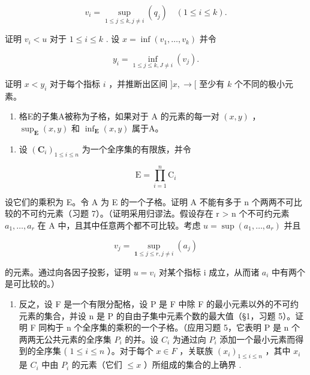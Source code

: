 \[
v _ {i} = \sup _ {1 \leqslant j \leqslant k, j \neq i} (q _ {j}) \quad (1 \leqslant i \leqslant k).
\]

证明 \(v_{i} < u\) 对于 \(1 \leqslant i \leqslant k\) . 设 \(x = \inf (v_{1}, \ldots, v_{k})\) 并令

\[
y _ {i} = \inf _ {1 \leqslant j \leqslant k, J \neq i} (v _ {j}).
\]

证明 \(x < y_i\) 对于每个指标 \(i\) ，并推断出区间 \(]x, \to[\) 至少有 \(k\) 个不同的极小元素。

\begin{enumerate}
\def\labelenumi{\arabic{enumi}.}
\setcounter{enumi}{8}
\tightlist
\item
  格E的子集A被称为子格，如果对于 A 的元素的每一对 \((x, y)\) ， \(\sup_{\mathbf{E}}(x, y)\) 和 \(\inf_{\mathbf{E}}(x, y)\) 属于A。
\end{enumerate}

\begin{enumerate}
\def\labelenumi{(\alph{enumi})}
\tightlist
\item
  设 \((\mathbf{C}_i)_{1\leqslant i\leqslant n}\) 为一个全序集的有限族，并令
\end{enumerate}

\[
\mathrm{E} = \prod_ {i = 1} ^ {n} \mathrm{C} _ {i}
\]

设它们的乘积为 E。令 A 为 E 的一个子格。证明 A 不能有多于 n 个两两不可比较的不可约元素（习题 7）。（证明采用归谬法。假设存在 r \textgreater{} n 个不可约元素 \(a_{1}, \ldots, a_{r}\) 在 A 中，且其中任意两个都不可比较。考虑 \(u = \sup(a_{1}, \ldots, a_{r})\) 并且

\[
v _ {j} = \sup _ {\mathbf {1} \leqslant j \leqslant r, j \neq i} (a _ {j})
\]

的元素。通过向各因子投影，证明 \(u = v_{i}\) 对某个指标 i 成立，从而诸 \(a_{i}\) 中有两个是可比较的。）

\begin{enumerate}
\def\labelenumi{(\alph{enumi})}
\setcounter{enumi}{1}
\tightlist
\item
  反之，设 F 是一个有限分配格，设 P 是 F 中除 F 的最小元素以外的不可约元素的集合，并设 n 是 P 的自由子集中元素个数的最大值（§1，习题 5）。证明 F 同构于 n 个全序集的乘积的一个子格。（应用习题 5，它表明 P 是 n 个两两无公共元素的全序集 \(P_{i}\) 的并。设 \(C_{i}\) 为通过向 \(P_{i}\) 添加一个最小元素而得到的全序集 ( \(1 \leqslant i \leqslant n\) ）。对于每个 \(x \in F\) ，关联族 \((x_{i})_{1 \leqslant i \leqslant n}\) ，其中 \(x_{i}\) 是 \(C_{i}\) 中由 \(P_{i}\) 的元素（它们 \(\leqslant x\) ）所组成的集合的上确界 .
\end{enumerate}

